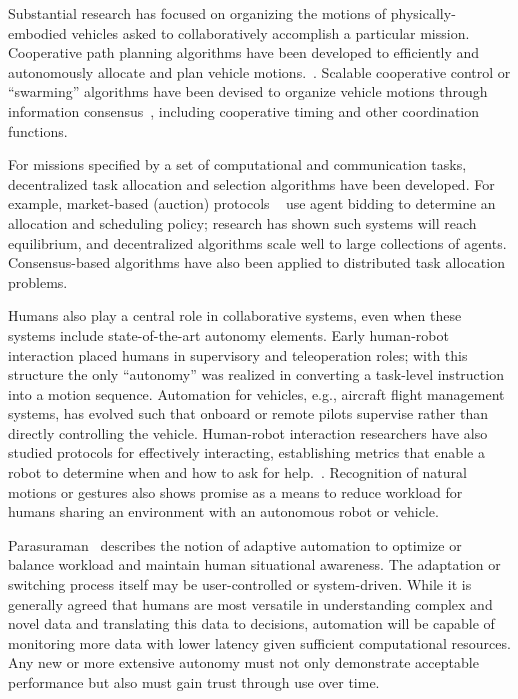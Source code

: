Substantial research has focused on organizing the motions of physically-embodied vehicles
asked to collaboratively accomplish a particular mission.  Cooperative path planning algorithms have been 
developed to efficiently and autonomously allocate and plan vehicle motions.~\cite{tsourdos2010cooperative,
bellingham2003multi}.  Scalable cooperative control or ``swarming'' algorithms 
have been devised to organize vehicle motions through information consensus~\cite{ren2007information}, 
including cooperative timing and other coordination functions.~\cite{mclain2005coordination}

For missions specified by a set of computational and communication tasks,
decentralized task allocation and selection algorithms have been developed.  For example, market-based 
(auction) protocols ~\cite{wellman2001auction, walsh2003decentralized}
use agent bidding to determine an allocation and scheduling policy; research has shown such
systems will reach equilibrium, and decentralized algorithms scale well to large collections of agents.
Consensus-based algorithms have also been applied to distributed task allocation problems.~\cite{choi2009consensus}

Humans also play a central role in collaborative systems, 
even when these systems include state-of-the-art autonomy elements.
Early human-robot interaction placed humans in supervisory and teleoperation roles; with this structure
the only ``autonomy'' was realized in converting a task-level instruction into a motion sequence.  Automation
for vehicles, e.g., aircraft flight management systems, has evolved such that onboard or remote pilots 
supervise rather than directly controlling the vehicle.  Human-robot interaction researchers have also studied
protocols for effectively interacting, establishing metrics that enable a robot to determine when and how to
ask for help.~\cite{fong2003collaboration}. Recognition of natural motions or gestures 
also shows promise as a means to reduce workload for humans sharing an environment with an autonomous robot or vehicle.
~\cite{nehaniv2005methodological}

Parasuraman~\cite{parasuraman2008humans} describes the notion of adaptive automation
to optimize or balance workload and maintain human situational awareness.  The adaptation or switching process
itself may be user-controlled or system-driven.  While it is generally agreed that humans are most versatile 
in understanding complex and novel data and translating this data to decisions, automation will be capable 
of monitoring more data with lower latency given sufficient computational resources.  Any new or more extensive
autonomy must not only demonstrate acceptable performance but also must gain trust through use over time.

